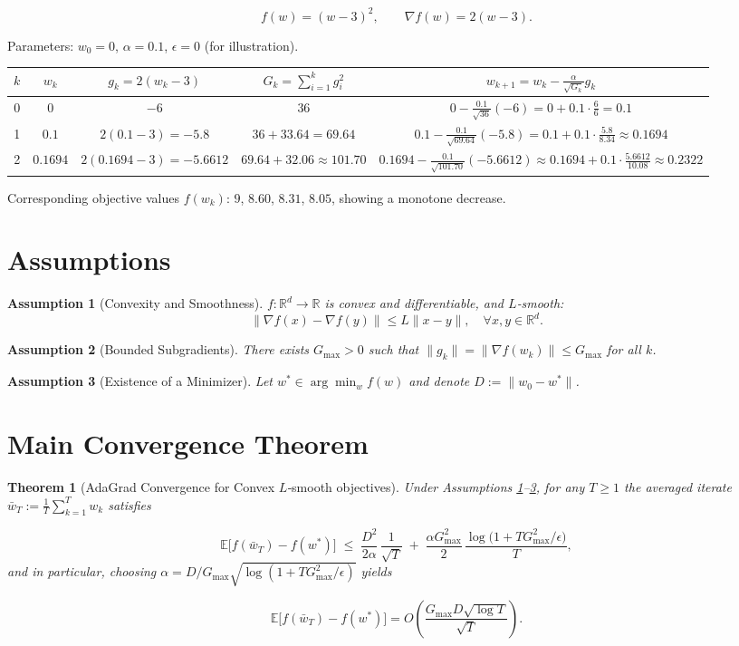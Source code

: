 \documentclass{article}
\newtheorem{theorem}{Theorem}
\newtheorem{assumption}{Assumption}
\newcommand{\E}{\mathbb{E}}
\newcommand{\R}{\mathbb{R}}
\begin{document}
\[
f(w) = (w-3)^2 ,\qquad \nabla f(w)=2(w-3).
\]

Parameters: $w_0=0$, $\alpha=0.1$, $\epsilon=0$ (for illustration).  

\begin{center}
\begin{tabular}{c|c|c|c|c}
$k$ & $w_k$ & $g_k=2(w_k-3)$ & $G_k=\sum_{i=1}^{k} g_i^2$ & $w_{k+1}=w_k-\frac{\alpha}{\sqrt{G_k}}g_k$\\\hline
0 & $0$ & $-6$ & $36$ & $0-\frac{0.1}{\sqrt{36}}(-6)=0+0.1\cdot\frac{6}{6}=0.1$\\
1 & $0.1$ & $2(0.1-3)=-5.8$ & $36+33.64=69.64$ &
$0.1-\frac{0.1}{\sqrt{69.64}}(-5.8)
=0.1+0.1\cdot\frac{5.8}{8.34}\approx0.1694$\\
2 & $0.1694$ & $2(0.1694-3)=-5.6612$ &
$69.64+32.06\approx101.70$ &
$0.1694-\frac{0.1}{\sqrt{101.70}}(-5.6612)
\approx0.1694+0.1\cdot\frac{5.6612}{10.08}\approx0.2322$
\end{tabular}
\end{center}

Corresponding objective values $f(w_k)$: $9$, $8.60$, $8.31$, $8.05$, showing a monotone decrease.

\section*{Assumptions}
\begin{assumption}[Convexity and Smoothness]\label{ass:convex}
$f:\R^{d}\to\R$ is convex and differentiable, and $L$‑smooth:
\[
\|\nabla f(x)-\nabla f(y)\|\le L\|x-y\|,\quad \forall x,y\in\R^{d}.
\]
\end{assumption}
\begin{assumption}[Bounded Subgradients]\label{ass:bound}
There exists $G_{\max}>0$ such that $\|g_k\|=\|\nabla f(w_k)\|\le G_{\max}$ for all $k$.
\end{assumption}
\begin{assumption}[Existence of a Minimizer]\label{ass:min}
Let $w^{\ast}\in\arg\min_{w}f(w)$ and denote $D:=\|w_0-w^{\ast}\|$.
\end{assumption}

\section*{Main Convergence Theorem}
\begin{theorem}[AdaGrad Convergence for Convex $L$‑smooth objectives]\label{thm:adagrad}
Under Assumptions \ref{ass:convex}--\ref{ass:min}, for any $T\ge1$ the averaged iterate 
$\bar w_T:=\frac1T\sum_{k=1}^{T} w_k$ satisfies  

\[
\E\!\bigl[f(\bar w_T)-f(w^{\ast})\bigr]
\;\le\;
\frac{D^2}{2\alpha}\,\frac{1}{\sqrt{T}}
\;+\;
\frac{\alpha G_{\max}^{2}}{2}\,\frac{\log\!\bigl(1+T G_{\max}^{2}/\epsilon\bigr)}{T},
\]
and in particular, choosing $\alpha = D/ G_{\max}\sqrt{\log(1+TG_{\max}^{2}/\epsilon)}$ yields  

\[
\E\!\bigl[f(\bar w_T)-f(w^{\ast})\bigr]=
O\!\left(\frac{G_{\max}D\sqrt{\log T}}{\sqrt{T}}\right).
\]
\end{theorem}
\end{document}
